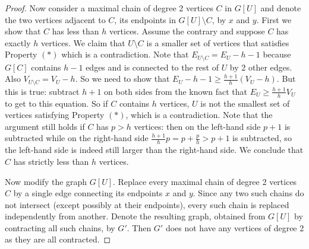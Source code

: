 \begin{proof}
Now consider a maximal chain of degree 2 vertices $C$ in $G[U]$ and denote the two vertices adjacent to $C$, its endpoints in $G[U] \setminus C$, by $x$ and $y$. First we show that $C$ has less than $h$ vertices. Assume the contrary and suppose $C$ has exactly $h$ vertices. We claim that $U \setminus C$ is a smaller set of vertices that satisfies Property $(*)$ which is a contradiction. Note that $E_{U \setminus C} = E_U - h - 1$ because $G[C]$ contains $h-1$ edges and is connected to the rest of $U$ by 2 other edges. Also $V_{U \setminus C} = V_U - h$. So we need to show that $E_U - h - 1 \geq \frac{h+1}{h} (V_U - h)$. But this is true: subtract $h+1$ on both sides from the known fact that $E_U \geq \frac{h+1}{h} V_U$ to get to this equation.
So if $C$ contains $h$ vertices, $U$ is not the smallest set of vertices satisfying Property $(*)$, which is a contradiction. Note that the argument still holds if $C$ has $p > h$ vertices: then on the left-hand side $p+1$ is subtracted while on the right-hand side $\frac{h+1}{h}p = p + \frac{p}{h} > p+1$ is subtracted, so the left-hand side is indeed still larger than the right-hand side. We conclude that $C$ has strictly less than $h$ vertices.

Now modify the graph $G[U]$. Replace every maximal chain of degree 2 vertices $C$ by a single edge connecting its endpoints $x$ and $y$. Since any two such chains do not intersect (except possibly at their endpoints), every such chain is replaced independently from another. Denote the resulting graph, obtained from $G[U]$ by contracting all such chains, by $G'$. Then $G'$ does not have any vertices of degree 2 as they are all contracted.



\end{proof}
